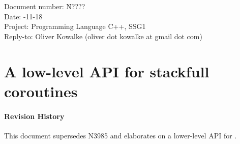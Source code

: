 \documentclass[a4paper,10pt,DIV15]{scrartcl}
\begin{document}
\small
\begin{tabbing}
    Document number: \= N????\\
    Date:            -11-18 \\
    Project:         \> Programming Language C++, SSG1\\
    Reply-to:        \> Oliver Kowalke (oliver dot kowalke at gmail dot com)\\
\end{tabbing}

\section*{A low-level API for stackfull coroutines}


\tableofcontents


\paragraph*{Revision History}
This document supersedes N3985 and elaborates on a lower-level API for \sfcoros.











\end{document}
